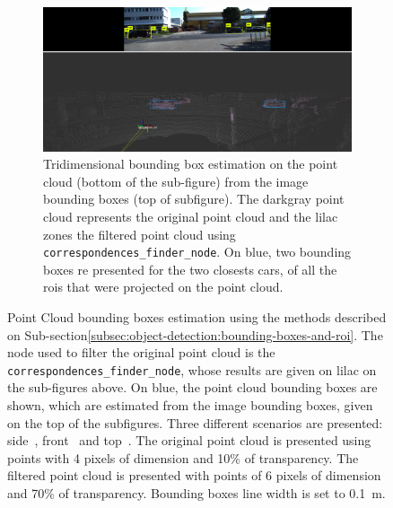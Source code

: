 \begin{figure}[ht!]
	\centering
	\begin{subfigure}[c]{0.8\textwidth}
		\includegraphics[width=\textwidth]{img/image-object-to-point-cloud/bboxes-side-view.png}
		\caption{Tridimensional bounding box estimation on the point cloud (bottom of the sub-figure) from the image bounding boxes (top of subfigure). The darkgray point cloud represents the original point cloud and the lilac zones the filtered point cloud using \texttt{correspondences\_finder\_node}. On blue, two bounding boxes re presented for the two closests cars, of all the \acp{roi} that were projected on the point cloud.}
		\label{fig:bboxes-3d-kitti-side}
	\end{subfigure}
	\caption{Point Cloud bounding boxes estimation using the methods described on Sub-section\ref{subsec:object-detection:bounding-boxes-and-roi}. The node used to filter the original point cloud is the \texttt{correspondences\_finder\_node}, whose results are given on lilac on the sub-figures above. On blue, the point cloud bounding boxes are shown, which are estimated from the image bounding boxes, given on the top of the subfigures. Three different scenarios are presented: side~, front~ and top~. The original point cloud is presented using points with 4 pixels of dimension and 10\% of transparency. The filtered point cloud is presented with points of 6 pixels of dimension and 70\% of transparency. Bounding boxes line width is set to \SI{0.1}{\meter}.} 
	\label{fig:bboxes-3d-kitti}
\end{figure}
